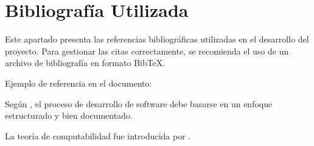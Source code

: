 \section{Bibliografía Utilizada}

Este apartado presenta las referencias bibliográficas utilizadas en el desarrollo del proyecto. Para gestionar las citas correctamente, se recomienda el uso de un archivo de bibliografía en formato BibTeX.

Ejemplo de referencia en el documento:


Según \cite{pressman2005ingenieria}, el proceso de desarrollo de software debe basarse en un enfoque estructurado y bien documentado.

La teoría de computabilidad fue introducida por \citep{turing1936}.